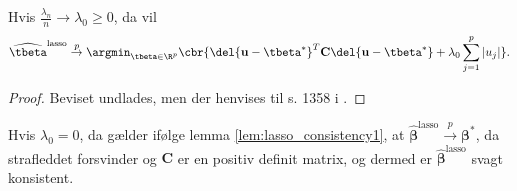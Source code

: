 \begin{lem}\label{lem:lasso_consistency1}
Hvis $\frac{\lambda_n}{n} \rightarrow \lambda_0 \geq 0$, da vil
\begin{align*}
\widehat{\tbeta}^\text{lasso} \overset{p}{\rightarrow} \argmin_{\tbeta \in \R^p} \cbr{ \del{\mathbf{u} - \tbeta^*}^T \mathbf{C} \del{\mathbf{u} - \tbeta^*} + \lambda_0 \sum_{j=1}^p \vert u_j \vert}.
\end{align*}
\end{lem}
\begin{proof}
Beviset undlades, men der henvises til s. 1358 i \citep{adaptive_lasso_knight}.
\end{proof}
Hvis $\lambda_0=0$, da gælder ifølge lemma \ref{lem:lasso_consistency1}, at $\widehat{\boldsymbol{\beta}}^\text{lasso} \overset{p}{\rightarrow} \boldsymbol{\beta}^{*}$, da strafleddet forsvinder og $\mathbf{C}$ er en positiv definit matrix, og dermed er $\widehat{\boldsymbol{\beta}}^\text{lasso}$ svagt konsistent. 

